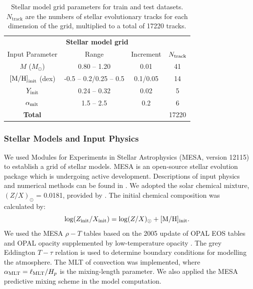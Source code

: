 \begin{table}
	\centering
	\caption[Stellar model grid parameters for train and test datasets.]{Stellar model grid parameters for train and test datasets. $N_\mathrm{track}$ are the numbers of stellar evolutionary tracks for each dimension of the grid, multiplied to a total of \num{17220} tracks.}
	\label{tab:grid}
	\begin{tabular}{cccc} %
		\toprule
		\multicolumn{4}{c}{\textbf{Stellar model grid}}\\
		Input Parameter & Range & Increment & $N_{\rm track}$\\
        \midrule
	$M$ ($M_{\odot}$)  & 0.80 -- 1.20 &  0.01& \num{41}\\
        $\rm{[M/H]}_\mathrm{init}$ (dex) & -0.5 -- 0.2/0.25 -- 0.5 & 0.1/0.05 & \num{14}\\
        	$Y_{\rm init}$ & 0.24 -- 0.32 & 0.02 & \num{5}\\
        $\alpha_{\rm{mlt}}$  & 1.5 -- 2.5&  0.2 & \num{6} \vspace{0.5em}\\
        \textbf{Total} & & & \num{17220}\\
        \bottomrule
    \end{tabular}
\end{table}

\subsubsection{Stellar Models and Input Physics}\label{subsec:stellar_model}

We used Modules for Experiments in Stellar Astrophysics
(\textsc{MESA}, version 12115) to establish a grid of stellar models. 
\textsc{MESA} is an open-source stellar evolution package which is undergoing active development. 
Descriptions of input physics and numerical methods
can be found in \citet{Paxton.Bildsten.ea2011, Paxton.Cantiello.ea2013, Paxton.Marchant.ea2015, Paxton.Schwab.ea2018, Paxton.Smolec.ea2019}.
We adopted the solar chemical mixture, $(Z/X)_{\odot}$ = 0.0181,
 provided by \citet{Asplund.Grevesse.ea2009}. 
The initial chemical composition was calculated by:
%
\begin{equation}
\log (Z_{\rm{init}}/X_{\rm{init}}) = \log (Z/X)_{\odot} + \rm{[M/H]_{init}}.  \\
\end{equation}
%
We used the \textsc{MESA} $\rho-T$ tables based on the 2005
update of OPAL EOS tables \citep{Rogers.Nayfonov2002} and OPAL opacity
supplemented by low-temperature opacity \citep{Ferguson.Alexander.ea2005}. The grey Eddington $T-\tau$ relation is used to determine boundary conditions for modelling the atmosphere. The MLT of convection was implemented, where 
$\alpha_{\rm MLT} = \ell_{\rm MLT}/H_p$ is the mixing-length parameter. 
We also applied the \textsc{MESA} predictive mixing scheme \citep{Paxton.Schwab.ea2018, Paxton.Smolec.ea2019} in the model computation. 

